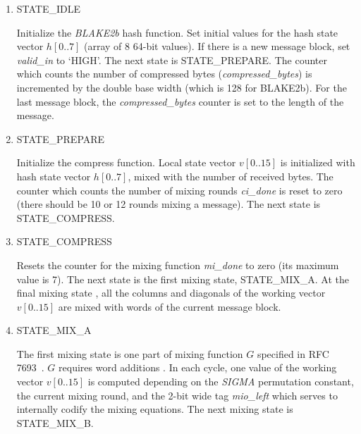 \documentclass[%
	a4paper,
]
{article}
\newcommand{\done}[1]{}
\begin{document}
\begin{enumerate}

	\item STATE_IDLE

		Initialize the \emph{BLAKE2b} hash function. Set initial values for the
		hash state vector $h[0..7]$ (array of 8 64-bit values). \done{If used as a
		hash function, use the pre-defined set of prime numbers' square roots.
		If used as a \gls{mac}, use a secret key instead, which is provided as
		input to the function.}
%
		If there is a new message block, set \emph{valid\_in} to
		`HIGH'. The next state is \mbox{STATE_PREPARE}. The counter which counts the
		number of compressed bytes (\emph{compressed\_bytes}) is incremented by
		the double base width (which is 128 for BLAKE2b). For the last message block,
		the \emph{compressed\_bytes} counter is set to the length of the message.

	\item STATE_PREPARE

		Initialize the compress function. Local state vector $v[0..15]$ is initialized
		with hash state vector $h[0..7]$, mixed with the number of received bytes.
		The counter which counts the number of mixing rounds \emph{ci_done} is reset
		to zero (there should be 10 or 12 rounds mixing a message). The next state is
		\mbox{STATE_COMPRESS}.

	\pagebreak

	\item STATE_COMPRESS

		Resets the counter for the mixing	function \emph{mi_done} to zero (its
		maximum	value is 7). The next state is the first mixing state,
		\mbox{STATE_MIX_A}. At the final mixing state \done{(which one is it? This
		is not quite clear to me...)},
		all the columns and diagonals of the working vector $v[0..15]$ are
		mixed with words of the current message block.

	\item STATE_MIX_A

		The first mixing state is one part of mixing function $G$ specified in
		RFC 7693~\autocite[7]{rfc7693}. $G$ requires word additions \done{(Does
		it mean to add words, or to perform the arithmetic operation `addition' on
		words?)}. In each cycle, one value of the working vector $v[0..15]$
		is computed depending on the \emph{SIGMA} permutation constant, the current
		mixing round, and the  2-bit wide tag \emph{mio_left} which serves
		to internally codify the mixing equations. The next mixing state is
		\mbox{STATE_MIX_B}.


\end{enumerate}
\end{document}
